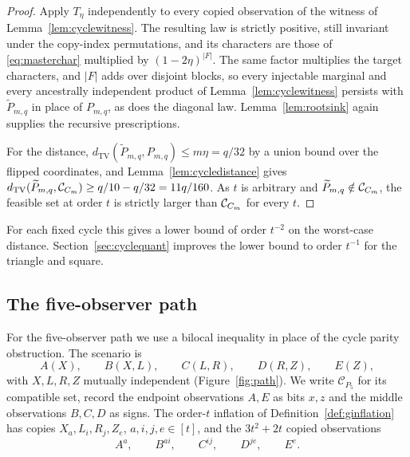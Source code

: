 \documentclass[11pt]{article}
\theoremstyle{plain}
\theoremstyle{definition}
\DeclareMathOperator{\TV}{TV}
\begin{document}
\begin{proof}
Apply $T_\eta$ independently to every copied observation of the witness of Lemma~\ref{lem:cyclewitness}. The resulting law is strictly positive, still invariant under the copy-index permutations, and its characters are those of \eqref{eq:masterchar} multiplied by $(1-2\eta)^{|F|}$. The same factor multiplies the target characters, and $|F|$ adds over disjoint blocks, so every injectable marginal and every ancestrally independent product of Lemma~\ref{lem:cyclewitness} persists with $\widetilde P_{m,q}$ in place of $P_{m,q}$, as does the diagonal law. Lemma~\ref{lem:rootsink} again supplies the recursive prescriptions.

For the distance, $d_{\TV}(\widetilde P_{m,q},P_{m,q})\le m\eta=q/32$ by a union bound over the flipped coordinates, and Lemma~\ref{lem:cycledistance} gives $d_{\TV}(\widetilde P_{m,q},\Ccyc)\ge q/10-q/32=11q/160$. As $t$ is arbitrary and $\widetilde P_{m,q}\notin\mathcal C_{C_m}$, the feasible set at order $t$ is strictly larger than $\mathcal C_{C_m}$ for every $t$.
\end{proof}

For each fixed cycle this gives a lower bound of order $t^{-2}$ on the worst-case distance. Section~\ref{sec:cyclequant} improves the lower bound to order $t^{-1}$ for the triangle and square.

\providecommand{\Cpath}{\mathcal C_{P_5}}
\providecommand{\Real}{\operatorname{Re}}

\subsection{The five-observer path}\label{sec:fivepath}

For the five-observer path we use a bilocal inequality in place of the cycle parity obstruction. The scenario is
\[
A(X),\qquad B(X,L),\qquad C(L,R),\qquad D(R,Z),\qquad E(Z),
\]
with $X,L,R,Z$ mutually independent (Figure~\ref{fig:path}). We write $\Cpath$ for its compatible set, record the endpoint observations $A,E$ as bits $x,z$ and the middle observations $B,C,D$ as signs. The order-$t$ inflation of Definition~\ref{def:ginflation} has copies $X_a,L_i,R_j,Z_e$, $a,i,j,e\in[t]$, and the $3t^2+2t$ copied observations
\[
A^a,\qquad B^{ai},\qquad C^{ij},\qquad D^{je},\qquad E^e .
\]
\end{document}
